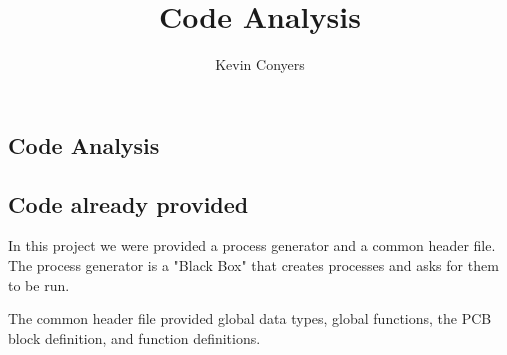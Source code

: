 \documentclass{article}
\title{Code Analysis}
\author{Kevin Conyers}
\begin{document}
\begin{center}
\section*{Code Analysis}
\end{center}
\subsection*{Code already provided}
In this project we were provided a process generator and a common header file.
The process generator is a "Black Box" that creates processes and asks for them to be run.
\par{}
The common header file provided global data types, global functions, the PCB block definition, and function definitions.
\end{document}
